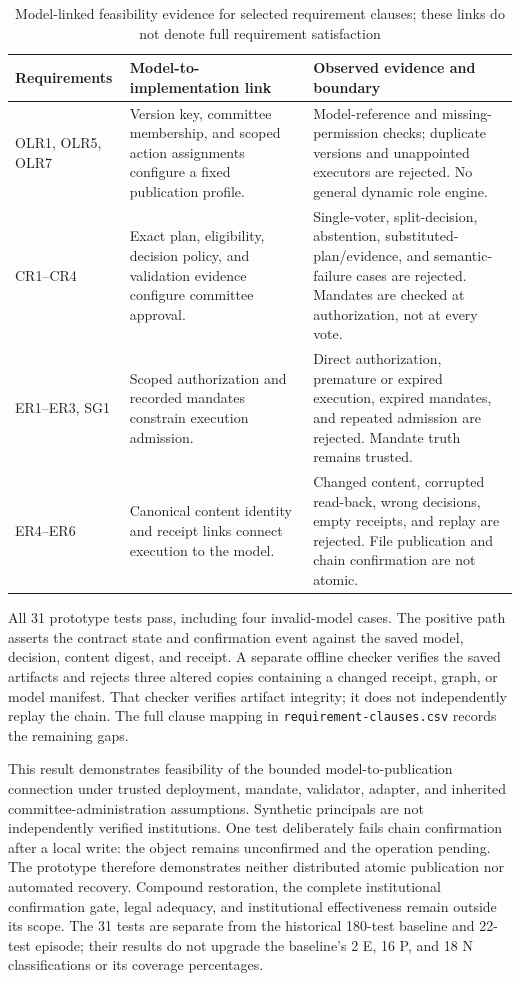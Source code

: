 \documentclass[journal]{IEEEtran}
\begin{document}
\begin{table}[t]
\centering\footnotesize
\caption{Model-linked feasibility evidence for selected requirement clauses;
these links do not denote full requirement satisfaction}
\label{tab:feasibility_model_links}
\begin{tabular}{@{}p{2.6cm}p{6.3cm}p{7.1cm}@{}}
\toprule
\textbf{Requirements} & \textbf{Model-to-implementation link} &
\textbf{Observed evidence and boundary} \\
\midrule
OLR1, OLR5, OLR7 &
Version key, committee membership, and scoped action assignments
configure a fixed publication profile. &
Model-reference and missing-permission checks; duplicate versions and
unappointed executors are rejected. No general dynamic role engine. \\
CR1--CR4 &
Exact plan, eligibility, decision policy, and validation evidence
configure committee approval. &
Single-voter, split-decision, abstention, substituted-plan/evidence, and semantic-failure
cases are rejected. Mandates are checked at authorization, not at every vote. \\
ER1--ER3, SG1 &
Scoped authorization and recorded mandates constrain execution admission. &
Direct authorization, premature or expired execution, expired mandates,
and repeated admission are rejected. Mandate truth remains trusted. \\
ER4--ER6 &
Canonical content identity and receipt links connect execution to the model. &
Changed content, corrupted read-back, wrong decisions, empty receipts,
and replay are rejected. File publication and chain confirmation are not atomic. \\
\bottomrule
\end{tabular}
\end{table}

All 31 prototype tests pass, including four invalid-model cases. The positive
path asserts the contract state and confirmation event against the saved
model, decision, content digest, and receipt. A separate offline checker
verifies the saved artifacts and rejects three altered copies containing
a changed receipt, graph, or model manifest. That checker verifies artifact
integrity; it does not independently replay the chain. The full clause
mapping in \texttt{requirement-clauses.csv} records the remaining gaps.

This result demonstrates feasibility of the bounded model-to-publication
connection under trusted deployment, mandate, validator, adapter, and
inherited committee-administration assumptions. Synthetic principals are
not independently verified institutions. One test deliberately fails chain
confirmation after a local write: the object remains unconfirmed and the
operation pending. The prototype therefore demonstrates neither distributed
atomic publication nor automated recovery. Compound restoration, the complete
institutional confirmation gate, legal adequacy, and institutional effectiveness
remain outside its scope. The 31 tests are separate from the historical
180-test baseline and 22-test episode; their results do not upgrade the
baseline's 2 E, 16 P, and 18 N classifications or its coverage percentages.
\end{document}
